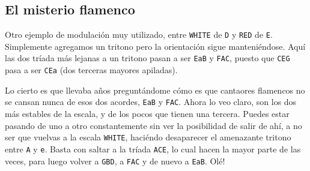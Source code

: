\documentclass[]{article}
\begin{document}
\subsection{El misterio flamenco}

Otro ejemplo de modulación muy utilizado, entre \texttt{WHITE} de \texttt{D} y \texttt{RED} de \texttt{E}. Simplemente agregamos un tritono pero la orientación sigue manteniéndose. Aquí las dos tríada más lejanas a un tritono pasan a ser \texttt{EaB} y \texttt{FAC}, puesto que \texttt{CEG} pasa a ser \texttt{CEa} (dos terceras mayores apiladas).

Lo cierto es que llevaba años preguntándome cómo es que cantaores flamencos no se cansan nunca de esos dos acordes, \texttt{EaB} y \texttt{FAC}. Ahora lo veo claro, son los dos más estables de la escala, y de los pocos que tienen una tercera. Puedes estar pasando de uno a otro constantemente sin ver la posibilidad de salir de ahí, a no ser que vuelvas a la escala \texttt{WHITE}, haciéndo desaparecer el amenazante tritono entre \texttt{A} y \texttt{e}. Basta con saltar a la tríada \texttt{ACE}, lo cual hacen la mayor parte de las veces, para luego volver a \texttt{GBD}, a \texttt{FAC} y de nuevo a \texttt{EaB}. Olé!
\end{document}

